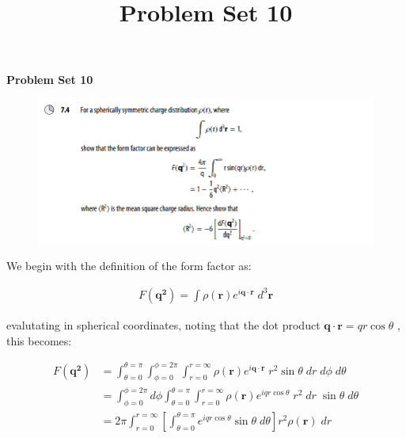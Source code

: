 \documentclass[11pt]{article}
\theoremstyle{definition}
\begin{document}
\setcounter{section}{2}
\title{Problem Set 10}

\pagestyle{fancy}
\fancyhf{}

\begin{center}
{\LARGE \bf Problem Set 10}\\
\end{center}

\begin{figure}[H]
    \centering
    \includegraphics[scale = 0.5]{7.4.png}
\end{figure}

We begin with the definition of the form factor as:

\begin{align}
    F (\mathbf{q^2}) = \int \rho(\mathbf{r}) e^{i\mathbf{q}\cdot\mathbf{r}}\; d^3\mathbf{r}
\end{align}

evalutating in spherical coordinates, noting that the dot product $\mathbf{q}\cdot\mathbf{r} = qr\cos\theta$ , this becomes:

\begin{align}
    F (\mathbf{q^2}) &= \int_{\theta=0}^{\theta=\pi}
    \int_{\phi=0}^{\phi=2\pi}
    \int_{r=0}^{r=\infty}  \rho(\mathbf{r}) e^{i\mathbf{q}\cdot\mathbf{r}}\; r^2 \sin\theta\; dr\; d\phi\; d\theta\\
    &= 
    \int_{\phi=0}^{\phi=2\pi}
    d\phi
    \int_{\theta=0}^{\theta=\pi}
    \int_{r=0}^{r=\infty}  \rho(\mathbf{r}) e^{iqr\cos\theta}\; r^2 \; dr\;\sin\theta \; d\theta\\
    &= 2\pi \int_{r=0}^{r=\infty} \left[\int_{\theta=0}^{\theta=\pi} e^{iqr\cos\theta}\sin\theta \; d\theta \right] r^2 \rho(\mathbf{r}) \; dr
\end{align}
\end{document}
